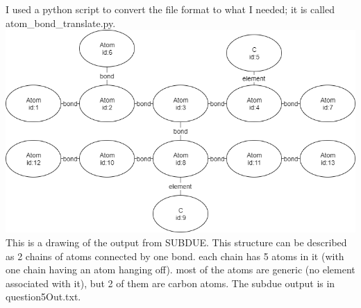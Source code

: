 \documentclass{article}
\begin{document}
\section{}
I used a python script to convert the file format to what I needed; it is called
atom\_bond\_translate.py. \\
\includegraphics[scale=.5]{question5Pic.png}
This is a drawing of the output from SUBDUE. This structure can be described as
2 chains of atoms connected by one bond. each chain has 5 atoms in it (with
one chain having an atom hanging off). most of the atoms are generic (no
element associated with it), but 2 of them are carbon atoms.
The subdue output is in question5Out.txt.
\end{document}
